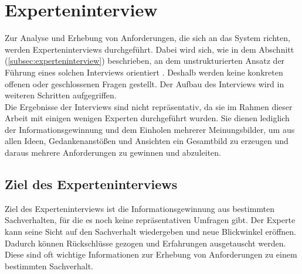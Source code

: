 \section{Experteninterview}
\label{sec:experteninterviewReqirements}
    Zur Analyse und Erhebung von Anforderungen, die sich an das System richten, werden Experteninterviews durchgeführt. 
    Dabei wird sich, wie in dem Abschnitt (\ref{subsec:experteninterview}) beschrieben, an dem unstrukturierten Ansatz der 
    Führung eines solchen Interviews orientiert \cite{robson2002real}. Deshalb werden keine konkreten offenen oder 
    geschlossenen Fragen gestellt. Der Aufbau des Interviews wird in weiteren Schritten aufgegriffen. 
    \\
    Die Ergebnisse der Interviews sind nicht repräsentativ, da sie im Rahmen dieser Arbeit mit einigen wenigen Experten durchgeführt wurden. Sie 
    dienen lediglich der Informationsgewinnung und dem Einholen mehrerer Meinungsbilder, um aus allen 
    Ideen, Gedankenanstößen und Ansichten ein Gesamtbild zu erzeugen und daraus mehrere Anforderungen zu gewinnen 
    und abzuleiten. 

\subsection{Ziel des Experteninterviews}
    Ziel des Experteninterviews ist die Informationsgewinnung aus bestimmten Sachverhalten, für die es 
    noch keine repräsentativen Umfragen gibt. Der Experte kann seine Sicht auf den Sachverhalt 
    wiedergeben und neue Blickwinkel eröffnen. Dadurch können Rückschlüsse gezogen und Erfahrungen ausgetauscht werden. Diese sind oft wichtige 
    Informationen zur Erhebung von Anforderungen zu einem bestimmten Sachverhalt. 

